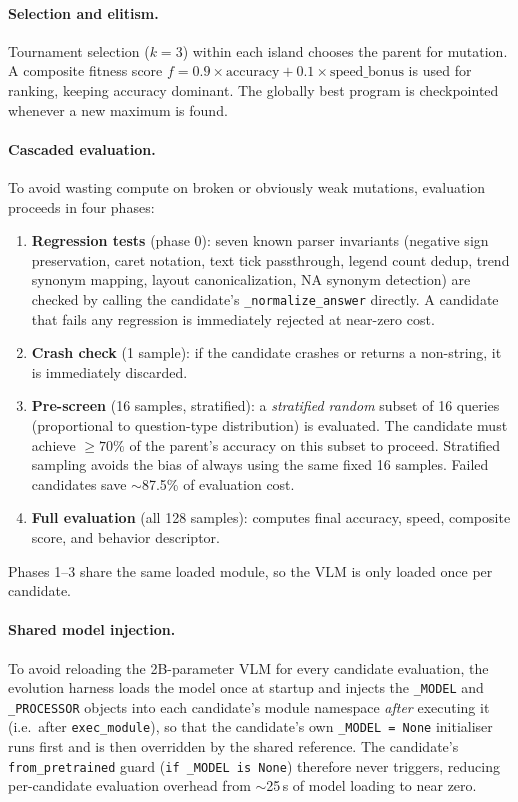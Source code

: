 \documentclass{article}
\begin{document}
\paragraph{Selection and elitism.}
Tournament selection ($k=3$) within each island chooses the parent for
mutation. A composite fitness score
$f = 0.9 \times \text{accuracy} + 0.1 \times \text{speed\_bonus}$
is used for ranking, keeping accuracy dominant. The globally best program is
checkpointed whenever a new maximum is found.

\paragraph{Cascaded evaluation.}
To avoid wasting compute on broken or obviously weak mutations, evaluation
proceeds in four phases:
\begin{enumerate}
  \item \textbf{Regression tests} (phase 0): seven known parser invariants
    (negative sign preservation, caret notation, text tick passthrough,
    legend count dedup, trend synonym mapping, layout canonicalization,
    NA synonym detection) are checked by calling the candidate's
    \texttt{\_normalize\_answer} directly.  A candidate that fails any
    regression is immediately rejected at near-zero cost.
  \item \textbf{Crash check} (1 sample): if the candidate crashes or returns a
    non-string, it is immediately discarded.
  \item \textbf{Pre-screen} (16 samples, stratified): a \emph{stratified random}
    subset of 16 queries (proportional to question-type distribution) is
    evaluated.  The candidate must achieve $\geq 70\%$
    of the parent's accuracy on this subset to proceed.  Stratified sampling
    avoids the bias of always using the same fixed 16 samples.  Failed
    candidates save $\sim$87.5\% of evaluation cost.
  \item \textbf{Full evaluation} (all 128 samples): computes final accuracy,
    speed, composite score, and behavior descriptor.
\end{enumerate}
Phases 1--3 share the same loaded module, so the VLM is only loaded once per
candidate.

\paragraph{Shared model injection.}
To avoid reloading the 2B-parameter VLM for every candidate evaluation, the
evolution harness loads the model once at startup and injects the
\texttt{\_MODEL} and \texttt{\_PROCESSOR} objects into each candidate's module
namespace \emph{after} executing it (i.e.\ after \texttt{exec\_module}), so
that the candidate's own \texttt{\_MODEL = None} initialiser runs first and is
then overridden by the shared reference.  The candidate's
\texttt{from\_pretrained} guard (\texttt{if \_MODEL is None}) therefore never
triggers, reducing per-candidate evaluation overhead from
$\sim$25\,s of model loading to near zero.
\end{document}
